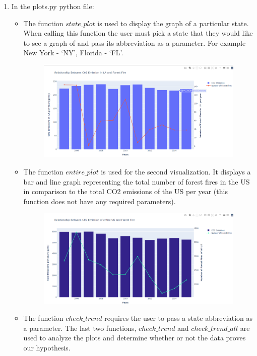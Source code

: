 \documentclass[fontsize=11pt]{article}
\begin{document}
\begin{enumerate}
\begin{itemize}
    \end{itemize}
    \item In the plots.py python file:
    \begin{itemize}
        \item The function $state\_plot$ is used to display the graph of a particular state. When calling this function the user must pick a state that they would like to see a graph of and pass its abbreviation as a parameter. For example New York - ‘NY’, Florida - ‘FL’.\\
            \begin{figure}[h]
            \centering
            \includegraphics[width = 16cm ]{Untitled.png}
            \label{fig:my_label}
        \end{figure}
\newpage
        \item The function $entire\_plot$ is used for the second visualization. It displays a bar and line graph representing the total number of forest fires in the US in comparison to the total CO2 emissions of the US per year (this function does not have any required parameters). \\
        \begin{figure}[h]
            \centering
            \includegraphics[width = 16cm]{usa.png}
            \label{Figure 6}
        \end{figure}
        
        \item The function $check\_trend$ requires the user to pass a state abbreviation as a parameter. The last two functions, $check\_trend$ and $check\_trend\_all$ are used to analyze the plots and determine whether or not the data proves our hypothesis. 
    \end{itemize}
    
\end{enumerate}
\end{document}
